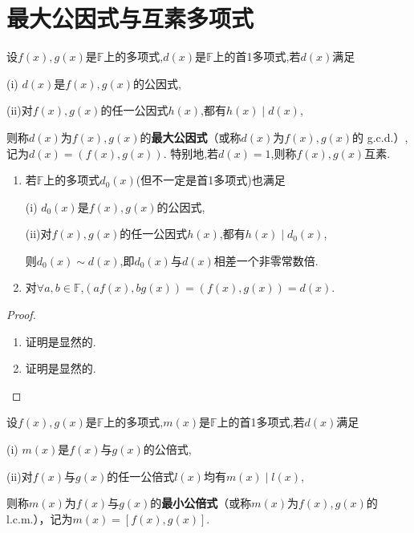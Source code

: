 \documentclass[../../main.tex]{subfiles}%
\begin{document}
\section{最大公因式与互素多项式}

\begin{definition}[最大公因式和互素]\label{definition:最大公因式和互素}
设\(f(x),g(x)\)是\(\mathbb{F}\)上的多项式,$d(x)$是\(\mathbb{F}\)上的首1多项式,若\(d(x)\)满足

(i)$\,\,d(x)$是\(f(x),g(x)\)的公因式,

(ii)对\(f(x),g(x)\)的任一公因式\(h(x)\),都有\(h(x)\mid d(x)\),

则称\(d(x)\)为\(f(x),g(x)\)的\textbf{最大公因式}（或称\(d(x)\)为\(f(x),g(x)\)的 g.c.d.）,记为\(d(x)=(f(x),g(x))\).
特别地,若\(d(x)=1\),则称\(f(x),g(x)\)互素.
\end{definition}

\begin{proposition}\label{proposition:最大公因式的小结论}
\begin{enumerate}[(1)]
\item 若$\mathbb{F}$上的多项式$d_0(x)$(但不一定是首1多项式)也满足

(i)$\,\,d_0(x)$是\(f(x),g(x)\)的公因式,

(ii)对\(f(x),g(x)\)的任一公因式\(h(x)\),都有\(h(x)\mid d_0(x)\),

则$d_0(x)\sim d(x)$,即$d_0(x)$与$d(x)$相差一个非零常数倍.

\item 对$\forall a,b\in\mathbb{F}$,$(af(x),bg(x))=(f(x),g(x))=d(x)$.
\end{enumerate}
\end{proposition}
\begin{proof}
\begin{enumerate}[(1)]
\item 证明是显然的.

\item 证明是显然的.
\end{enumerate}

\end{proof}

\begin{definition}[最小公倍式]\label{definition:最小公倍式}
设\(f(x),g(x)\)是\(\mathbb{F}\)上的多项式,$m(x)$是\(\mathbb{F}\)上的首1多项式,若\(d(x)\)满足

(i)\(\,\,m(x)\)是\(f(x)\)与\(g(x)\)的公倍式,

(ii)对\(f(x)\)与\(g(x)\)的任一公倍式\(l(x)\)均有\(m(x)\mid l(x)\),

则称\(m(x)\)为\(f(x)\)与\(g(x)\)的\textbf{最小公倍式}（或称\(m(x)\)为\(f(x),g(x)\)的 l.c.m.），记为\(m(x)=[f(x),g(x)]\).
\end{definition}
\end{document}

